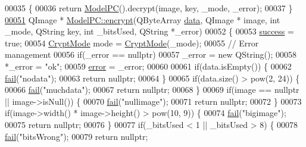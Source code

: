 \begin{DoxyCode}
00035 \{
00036     \textcolor{keywordflow}{return} \hyperlink{class_model_p_c_ae12ebe65ec973c02a0de4850a7c1e31c}{ModelPC}().decrypt(image, key, \_mode, \_error);
00037 \}
\hypertarget{modelpc_8cpp_source_l00051}{}\hyperlink{class_model_p_c_a6f191f62d4635d0d3555fcc0be298794}{00051} QImage * \hyperlink{class_model_p_c_a6f191f62d4635d0d3555fcc0be298794}{ModelPC::encrypt}(QByteArray \hyperlink{namespace_errors_dict_setup_adf4c30d205d29df7343e26f7c62b0685}{data}, QImage * image, \textcolor{keywordtype}{int} \_mode, QString key, \textcolor{keywordtype}{int} 
      \_bitsUsed, QString *\_error)
00052 \{
00053     \hyperlink{class_model_p_c_a945ffbbc44a832b953c191debd448f4c}{success} = \textcolor{keyword}{true};
00054     \hyperlink{class_model_p_c_a296dd7afe3e1c49b3da25fd644fe4ceb}{CryptMode} mode = \hyperlink{class_model_p_c_a296dd7afe3e1c49b3da25fd644fe4ceb}{CryptMode}(\_mode);
00055     \textcolor{comment}{// Error management}
00056     \textcolor{keywordflow}{if}(\_error == \textcolor{keyword}{nullptr})
00057         \_error = \textcolor{keyword}{new} QString();
00058     *\_error = \textcolor{stringliteral}{"ok"};
00059     \hyperlink{class_model_p_c_a4e5a9c0ca1f06fe5bc478b6bf248c37c}{error} = \_error;
00060 
00061     \textcolor{keywordflow}{if}(data.isEmpty()) \{
00062         \hyperlink{class_model_p_c_a47464b59b7e37fcee25e55475708aabd}{fail}(\textcolor{stringliteral}{"nodata"});
00063         \textcolor{keywordflow}{return} \textcolor{keyword}{nullptr};
00064     \}
00065     \textcolor{keywordflow}{if}(data.size() > pow(2, 24)) \{
00066         \hyperlink{class_model_p_c_a47464b59b7e37fcee25e55475708aabd}{fail}(\textcolor{stringliteral}{"muchdata"});
00067         \textcolor{keywordflow}{return} \textcolor{keyword}{nullptr};
00068     \}
00069     \textcolor{keywordflow}{if}(image == \textcolor{keyword}{nullptr} || image->isNull()) \{
00070         \hyperlink{class_model_p_c_a47464b59b7e37fcee25e55475708aabd}{fail}(\textcolor{stringliteral}{"nullimage"});
00071         \textcolor{keywordflow}{return} \textcolor{keyword}{nullptr};
00072     \}
00073     \textcolor{keywordflow}{if}(image->width() * image->height() > pow(10, 9)) \{
00074         \hyperlink{class_model_p_c_a47464b59b7e37fcee25e55475708aabd}{fail}(\textcolor{stringliteral}{"bigimage"});
00075         \textcolor{keywordflow}{return} \textcolor{keyword}{nullptr};
00076     \}
00077     \textcolor{keywordflow}{if}(\_bitsUsed < 1 || \_bitsUsed > 8) \{
00078         \hyperlink{class_model_p_c_a47464b59b7e37fcee25e55475708aabd}{fail}(\textcolor{stringliteral}{"bitsWrong"});
00079         \textcolor{keywordflow}{return} \textcolor{keyword}{nullptr};

\end{DoxyCode}
